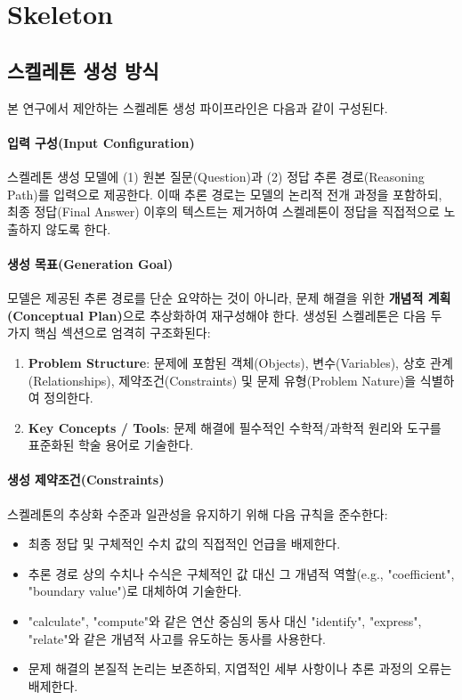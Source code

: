 \appendix


\section{Skeleton}\label{Appendix:about-skeleton}

\subsection{스켈레톤 생성 방식}
본 연구에서 제안하는 스켈레톤 생성 파이프라인은 다음과 같이 구성된다.

\paragraph{입력 구성(Input Configuration)} 스켈레톤 생성 모델에 (1) 원본 질문(Question)과 (2) 정답 추론 경로(Reasoning Path)를 입력으로 제공한다. 이때 추론 경로는 모델의 논리적 전개 과정을 포함하되, 최종 정답(Final Answer) 이후의 텍스트는 제거하여 스켈레톤이 정답을 직접적으로 노출하지 않도록 한다.

\paragraph{생성 목표(Generation Goal)} 모델은 제공된 추론 경로를 단순 요약하는 것이 아니라, 문제 해결을 위한 \textbf{개념적 계획(Conceptual Plan)}으로 추상화하여 재구성해야 한다. 생성된 스켈레톤은 다음 두 가지 핵심 섹션으로 엄격히 구조화된다:
\begin{enumerate}
    \item \textbf{Problem Structure}: 문제에 포함된 객체(Objects), 변수(Variables), 상호 관계(Relationships), 제약조건(Constraints) 및 문제 유형(Problem Nature)을 식별하여 정의한다.
    \item \textbf{Key Concepts / Tools}: 문제 해결에 필수적인 수학적/과학적 원리와 도구를 표준화된 학술 용어로 기술한다.
\end{enumerate}

\paragraph{생성 제약조건(Constraints)} 스켈레톤의 추상화 수준과 일관성을 유지하기 위해 다음 규칙을 준수한다:
\begin{itemize}
    \item 최종 정답 및 구체적인 수치 값의 직접적인 언급을 배제한다.
    \item 추론 경로 상의 수치나 수식은 구체적인 값 대신 그 개념적 역할(e.g., "coefficient", "boundary value")로 대체하여 기술한다.
    \item "calculate", "compute"와 같은 연산 중심의 동사 대신 "identify", "express", "relate"와 같은 개념적 사고를 유도하는 동사를 사용한다.
    \item 문제 해결의 본질적 논리는 보존하되, 지엽적인 세부 사항이나 추론 과정의 오류는 배제한다.
\end{itemize}


